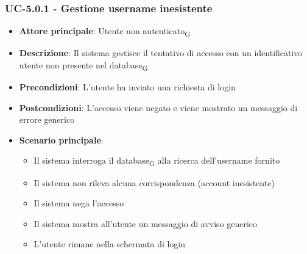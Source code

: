 \documentclass[11pt,a4paper]{article}
\newcommand{\gls}[1]{#1\textsubscript{G}}
\begin{document}
\subsubsection{UC-5.0.1 - Gestione username inesistente}
\begin{itemize}
    \item \textbf{Attore principale}: \gls{Utente non autenticato}
    \item \textbf{Descrizione}: Il sistema gestisce il tentativo di accesso con un identificativo utente non presente nel \gls{database}
    \item \textbf{Precondizioni}: L’utente ha inviato una richiesta di login
    \item \textbf{Postcondizioni}: L’accesso viene negato e viene mostrato un messaggio di errore generico
    \item \textbf{Scenario principale}:
    \begin{itemize}
        \item Il sistema interroga il \gls{database} alla ricerca dell'username fornito
        \item Il sistema non rileva alcuna corrispondenza (account inesistente)
        \item Il sistema nega l'accesso
        \item Il sistema mostra all’utente un messaggio di avviso generico
        \item L'utente rimane nella schermata di login
    \end{itemize}
\end{itemize}
\end{document}
